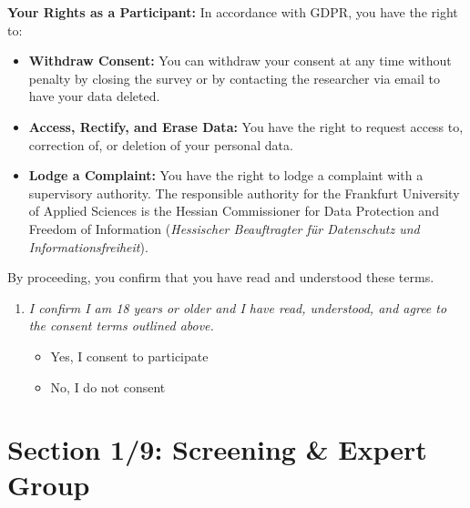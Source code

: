 \medskip
\noindent\textbf{Your Rights as a Participant:} In accordance with GDPR, you have the right to:
\begin{itemize}
    \item \textbf{Withdraw Consent:} You can withdraw your consent at any time without penalty by closing the survey or by contacting the researcher via email to have your data deleted.
    \item \textbf{Access, Rectify, and Erase Data:} You have the right to request access to, correction of, or deletion of your personal data.
    \item \textbf{Lodge a Complaint:} You have the right to lodge a complaint with a supervisory authority. The responsible authority for the Frankfurt University of Applied Sciences is the Hessian Commissioner for Data Protection and Freedom of Information (\textit{Hessischer Beauftragter für Datenschutz und Informationsfreiheit}).
\end{itemize}

\noindent By proceeding, you confirm that you have read and understood these terms.

\begin{enumerate}[label=\textbf{Q1.}, leftmargin=3em, resume]
    \item[*] \textit{I confirm I am 18 years or older and I have read, understood, and agree to the consent terms outlined above.}
    \begin{itemize}
        \item[$\bigcirc$] Yes, I consent to participate
        \item[$\bigcirc$] No, I do not consent
    \end{itemize}
\end{enumerate}

\section*{Section 1/9: Screening \& Expert Group}

